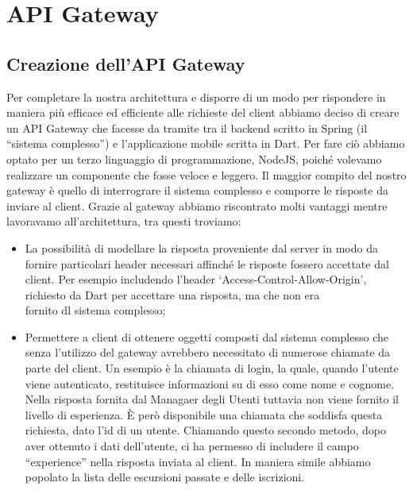 \section{API Gateway}
\subsection{Creazione dell'API Gateway}
Per completare la nostra architettura e disporre di un modo per rispondere in maniera più efficace ed efficiente alle richieste del client abbiamo deciso di creare un API Gateway che facesse da tramite tra il backend scritto in Spring (il ``sistema complesso'') e l'applicazione mobile scritta in Dart. Per fare ciò abbiamo optato per un terzo linguaggio di programmazione, NodeJS, poiché volevamo realizzare un componente che fosse veloce e leggero. Il maggior compito del nostro gateway è quello di interrograre il sistema complesso e comporre le risposte da inviare al client. Grazie al gateway abbiamo riscontrato molti vantaggi mentre lavoravamo all'architettura, tra questi troviamo:
\begin{itemize}
  \item La possibilità di modellare la risposta proveniente dal server in modo da fornire particolari header necessari affinché le risposte fossero accettate dal client. Per esempio includendo l'header `Access-Control-Allow-Origin', richiesto da Dart per accettare una risposta, ma che non era \\ fornito dl sistema complesso;
  \item Permettere a client di ottenere oggetti composti dal sistema complesso che senza l'utilizzo del gateway avrebbero necessitato di numerose chiamate da parte del client. Un esempio è la chiamata di login, la quale, quando l'utente viene autenticato, restituisce informazioni su di esso come nome e cognome. Nella risposta fornita dal Managaer degli Utenti tuttavia non viene fornito il livello di esperienza. È però disponibile una chiamata che soddisfa questa richiesta, dato l'id di un utente. Chiamando questo secondo metodo, dopo aver ottenuto i dati dell'utente, ci ha permesso di includere il campo ``experience'' nella risposta inviata al client. In maniera simile abbiamo popolato la lista delle escursioni passate e delle iscrizioni.
\end{itemize}
\newpage
